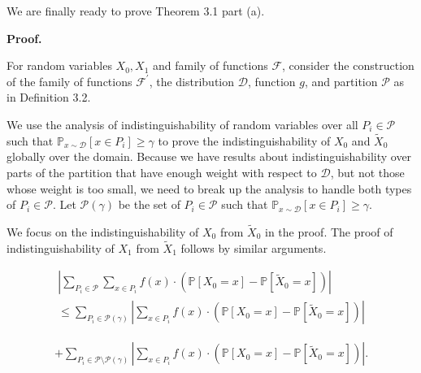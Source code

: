 \documentclass[10pt,a4paper]{article}
\begin{document}
We are finally ready to prove Theorem 3.1 part (a).\par





\par\medskip\noindent\textbf{Proof.}\par




For random variables $X_{0},X_{1}$ and family of functions $\mathcal{F}$, consider the construction of the family of functions $\mathcal{F}^{\prime}$, the distribution $\mathcal{D}$, function $g$, and partition $\mathcal{P}$ as in Definition 3.2.\par




We use the analysis of indistinguishability of random variables over all $P_{i}\in\mathcal{P}$ such that $\mathbb{P}_{x\sim\mathcal{D}}[x\in P_{i}]\geq\gamma$ to prove the indistinguishability of $X_{0}$ and $\widetilde{X}_{0}$ globally over the domain. Because we have results about indistinguishability over parts of the partition that have enough weight with respect to $\mathcal{D}$, but not those whose weight is too small, we need to break up the analysis to handle both types of $P_{i}\in\mathcal{P}$. Let $\mathcal{P}(\gamma)$ be the set of $P_{i}\in\mathcal{P}$ such that $\mathbb{P}_{x\sim\mathcal{D}}[x\in P_{i}]\geq\gamma$.\par




We focus on the indistinguishability of $X_{0}$ from $\widetilde{X}_{0}$ in the proof. The proof of indistinguishability of $X_{1}$ from $\widetilde{X}_{1}$ follows by similar arguments.\par


\[\begin{gathered}
\displaystyle\left|\sum_{P_{i}\in\mathcal{P}}\sum_{x\in P_{i}}f(x)\cdot\left(\mathbb{P}[X_{0}=x]-\mathbb{P}[\widetilde{X}_{0}=x]\right)\right| \\
\displaystyle\leq\sum_{P_{i}\in\mathcal{P}(\gamma)}\left|\sum_{x\in P_{i}}f(x)\cdot\left(\mathbb{P}[X_{0}=x]-\mathbb{P}[\widetilde{X}_{0}=x]\right)\right|
\end{gathered}\]


\[\begin{gathered}
+\sum_{P_{i}\in\mathcal{P}\setminus\mathcal{P}(\gamma)}\left|\sum_{x\in P_{i}}f(x)\cdot\left(\mathbb{P}[X_{0}=x]-\mathbb{P}[\widetilde{X}_{0}=x]\right)\right|.
\end{gathered}\]
\end{document}
